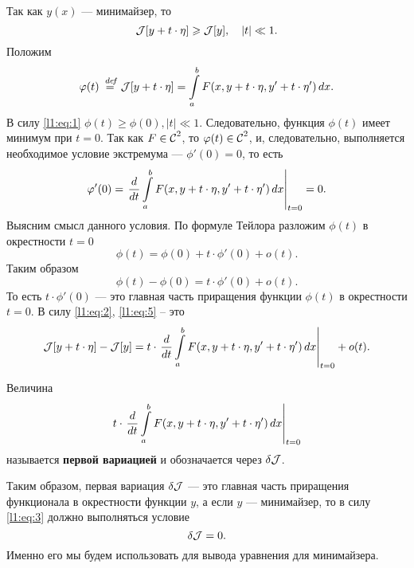 Так как $y(x)$ --- минимайзер, то 
\begin{equation}
	\label{l1:eq:1}
	\J[y+t\cdot\eta]\geqslant\J[y],\quad |t|\ll1.
\end{equation}
Положим 
\begin{equation}
	\label{l1:eq:2}
	\phi(t)\eqdef\J[y+t\cdot\eta]=\int\limits_a^b F(x,y+t\cdot\eta,y'+t\cdot\eta')\,\dd{x}.
\end{equation}
В силу \eqref{l1:eq:1} $\phi(t)\geqslant\phi(0), |t|\ll1$. Следовательно, функция $\phi(t)$ имеет минимум при $t=0$. Так как $F\in\Cfn[]{2}$, то $\phi(t)\in\Cfn[]{2}$, и, следовательно, выполняется необходимое условие экстремума --- $\phi'(0)=0$, то есть
\begin{equation}
	\label{l1:eq:3}
	\phi'(0)=\left.\der{}{t}\int\limits_a^b F(x,y+t\cdot\eta,y'+t\cdot\eta')\,\dd{x}\right|_{t=0}=0.
\end{equation}
Выясним смысл данного условия. По формуле Тейлора разложим $\phi(t)$ в окрестности $t=0$
\begin{equation}
	\label{l1:eq:4}
	\phi(t)=\phi(0)+t\cdot\phi'(0)+o(t).
\end{equation}
Таким образом
\begin{equation}
	\label{l1:eq:5}
	\phi(t)-\phi(0)=t\cdot\phi'(0)+o(t).
\end{equation}
То есть $t\cdot\phi'(0)$ --- это главная часть приращения функции $\phi(t)$ в окрестности $t=0$. В силу \eqref{l1:eq:2}, \eqref{l1:eq:5} -- это 
\begin{equation}
	\label{l1:eq:6}
	\J[y+t\cdot\eta]-\J[y]=t\cdot\left.\der{}{t}\int\limits_a^b F(x,y+t\cdot\eta,y'+t\cdot\eta')\,\dd{x}\right|_{t=0}+o(t).
\end{equation}
\begin{Def}
	Величина 
	\begin{equation*}
		t\cdot\left.\der{}{t}\int\limits_a^b F(x,y+t\cdot\eta,y'+t\cdot\eta')\,\dd{x}\right|_{t=0}
	\end{equation*} 
	называется \textbf{первой вариацией} и обозначается через $\delta\J$.
\end{Def}

Таким образом, первая вариация $\delta\J$ --- это главная часть приращения функционала в окрестности функции $y$, а если $y$ --- минимайзер, то в силу \eqref{l1:eq:3} должно выполняться условие
\begin{equation}
	\label{l1:eq:7}
	\delta\J=0.
\end{equation}
Именно его мы будем использовать для вывода уравнения для минимайзера.

